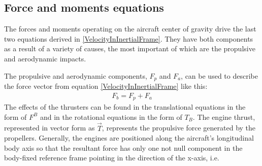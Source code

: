 \documentclass[twocolumn,showpacs,
    nofootinbib,aps,superscriptaddress,
    eqsecnum,prd,showkeys,10pt,floatfix]{revtex4}
\begin{document}
\subsection{Force and moments equations}
The forces and moments operating on the aircraft center of gravity drive the
last two equations derived in {\ref{VelocityInInertialFrame}}. They have both
components as a result of a variety of causes, the most important of which are
the propulsive and aerodynamic impacts.
\par
The propulsive and aerodynamic components, $F_p$ and $F_a$, can be used to
describe the force vector from equation {\ref{VelocityInInertialFrame}} like
this:
\begin{align}
    F_b=F_p+F_a
    \label{SumOfAerodynamicAndPropulsionForces}
\end{align}
The effects of the thrusters can be found in the translational equations in the form of $F^B$ and in the rotational equations in the form of $T_B$.
The engine thrust, represented in vector form as $\vec{T}$, represents the propulsive force generated by the propellers.
Generally, the engines are positioned along the aircraft's longitudinal body axis so that the resultant force has only one not null component in the body-fixed reference frame pointing in the direction of the x-axis, i.e.
\end{document}
